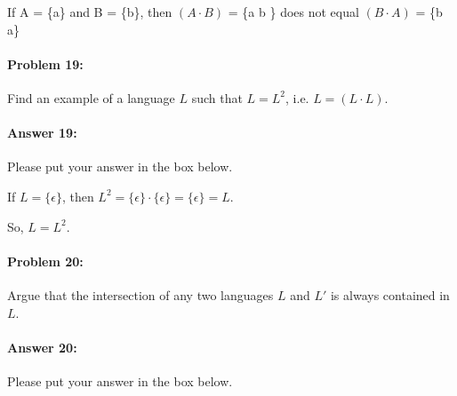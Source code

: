 \documentclass[10pt]{article}
\newenvironment{AnswerBox}{\begin{mdframed}[style=simple]}{\end{mdframed}}
\begin{document}
\begin{AnswerBox}%

  If A = \{a\} and B = \{b\}, then $(A\cdot B)$ = \{a b \} does not equal $(B\cdot A)$ = \{b a\}

\end{AnswerBox}%

\noindent\hrulefill %

\paragraph{Problem 19:}
Find an example of a language $L$ such that $L=L^2$, i.e. $L=(L\cdot L)$.

\paragraph{Answer 19:} Please put your answer in the box below.

\begin{AnswerBox}%

  If $L = \{\epsilon\}$, then $L^2 = \{\epsilon\} \cdot \{\epsilon\} = \{\epsilon\} = L$.

  So, $L = L^2$.

\end{AnswerBox}%

\noindent\hrulefill %

\paragraph{Problem 20:}
Argue that the intersection of any two languages $L$ and $L'$ is always
contained in $L$.

\paragraph{Answer 20:} Please put your answer in the box below.

\begin{AnswerBox}%


\end{AnswerBox}%
\end{document}
